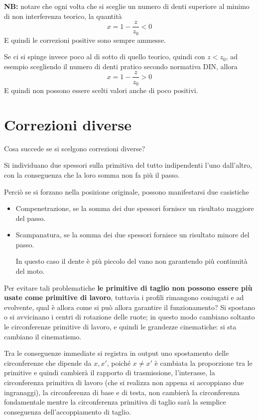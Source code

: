 \documentclass[a4paper, 15pt]{article}
\begin{document}
\begin{adjustwidth}{2in}{}
				 \textbf{NB:} notare che ogni volta che si sceglie un numero di denti superiore al minimo di non interferenza teorico, la quantità 
				 \[x = 1 - \dfrac{z}{z_0}<0\]
				 E quindi le correzioni positive sono sempre ammesse. 
				 
				 Se ci si spinge invece poco al di sotto di quello teorico, quindi con $z<z_0$, ad esempio scegliendo il numero di denti pratico secondo normativa DIN, allora 
				 \[x = 1 - \dfrac{z}{z_0}>0\]
				 E quindi non possono essere scelti valori anche di poco positivi. 
				 
				\end{adjustwidth}
\newpage
				\section{Correzioni diverse}
				\begin{adjustwidth}{2in}{}	
				Cosa succede se si scelgono correzioni diverse? 
				
				Si individuano due spessori sulla primitiva del tutto indipendenti l'uno dall'altro, con la conseguenza che la loro somma non fa più il passo. 
				
				Perciò se si forzano nella posizione originale, possono manifestarsi due casistiche 
				\begin{itemize}
					\item Compenetrazione, se la somma dei due spessori fornisce un risultato maggiore del passo.
					\item Scampanatura, se la somma dei due spessori fornisce un risultato minore del passo. 
					
					In questo caso il dente è più piccolo del vano non garantendo più continuità del moto.
				\end{itemize}
				Per evitare tali problematiche \textbf{le primitive di taglio non possono essere più usate come primitive di lavoro}, tuttavia i profili rimangono coniugati e ad evolvente, qual è allora come si può allora garantire il funzionamento? Si spostano o si avvicinano i centri di rotazione delle ruote; in questo modo cambiano soltanto le circonferenze primitive di lavoro, e quindi le grandezze cinematiche:  si sta cambiano il cinematismo. 
				
				Tra le conseguenze immediate si registra in output uno spostamento delle circonferenze che dipende da $x, x'$, poiché $x\ne x'$ è cambiata la proporzione tra le primitive e quindi cambierà il rapporto di trasmissione, l'interasse, la circonferenza primitiva di lavoro (che si realizza non appena si accoppiano due ingranaggi), la circonferenza di base e di testa, non cambierà la circonferenza fondamentale mentre la circonferenza primitiva di taglio sarà la semplice conseguenza dell'accoppiamento di taglio. \newline 
				

\end{adjustwidth}
\end{document}

